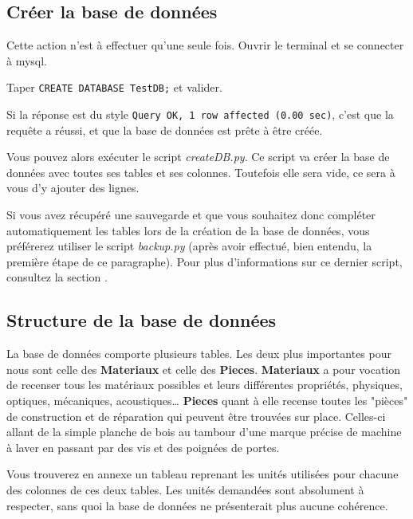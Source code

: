 \documentclass[12pt,a4paper]{article}
\begin{document}
    \subsection{Créer la base de données}\label{createdb}

        Cette action n'est à effectuer qu'une seule fois.
        Ouvrir le terminal %
        et se connecter à mysql.

        Taper \verb+CREATE DATABASE TestDB;+ et valider.
    
        Si la réponse est du style \verb+Query OK, 1 row affected (0.00 sec)+, c'est
        que la requête a réussi, et que la base de données est prête à être créée.

        Vous pouvez alors exécuter le script \emph{createDB.py}. Ce script va créer
        la base de données avec toutes ses tables et ses colonnes. Toutefois elle
        sera vide, ce sera à vous d'y ajouter des lignes.

        Si vous avez récupéré une sauvegarde et que vous souhaitez donc compléter
        automatiquement les tables lors de la création de la base de données, vous
        préférerez utiliser le script \emph{backup.py} (après avoir effectué, bien
        entendu, la première étape de ce paragraphe). Pour plus d'informations sur
        ce dernier script, consultez la section .

    \bigskip
    \subsection{Structure de la base de données}\label{structuredb}
        La base de données comporte plusieurs tables.
        Les deux plus importantes pour nous sont celle des \textbf{Materiaux} et celle des \textbf{Pieces}.
        \textbf{Materiaux} a pour vocation de recenser tous les matériaux possibles
        et leurs différentes propriétés, physiques, optiques, mécaniques, acoustiques\dots
        \textbf{Pieces} quant à elle recense toutes les "pièces" de construction et de réparation
        qui peuvent être trouvées sur place. Celles-ci allant de la simple planche de bois
        au tambour d'une marque précise de machine à laver en passant par des vis et des
        poignées de portes. 

        Vous trouverez en annexe un tableau reprenant les unités utilisées pour chacune des colonnes de ces deux tables.
        Les unités demandées sont absolument à respecter, sans quoi la base de données ne présenterait plus aucune cohérence.
\end{document}
